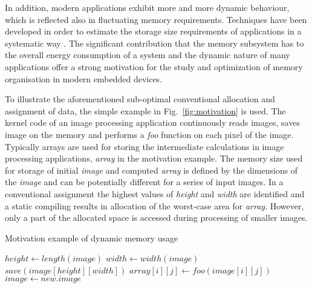 \documentclass{acm_proc_article-sp}
\begin{document}
In addition, modern applications exhibit more and more dynamic behaviour, which is reflected also in fluctuating memory requirements. Techniques have been developed in order to estimate the storage size requirements of applications in a systematic way \cite{Ang13}. The significant contribution that the memory subsystem has to the overall energy consumption of a system and the dynamic nature of many applications offer a strong motivation for the study and optimization of memory organisation in modern embedded devices.

To illustrate the aforementioned sub-optimal conventional allocation and assignment of data, the simple example in Fig.~\ref{fig:motivation} is used. The kernel code of an image processing application continuously reads images, saves image on the memory and performs a \textit{foo} function on each pixel of the image. Typically arrays are used for storing the intermediate calculations in image processing applications, \textit{array} in the motivation example. The memory size used for storage of initial \textit{image} and computed \textit{array} is defined by the dimensions of the \textit{image} and can be potentially different for a series of input images. In a conventional assignment the highest values of \textit{height} and \textit{width} are identified and a static compiling results in allocation of the worst-case area for \textit{array}. However, only a part of the allocated space is accessed during processing of smaller images. 

\begin{algorithm}[H]
\caption{Motivation example of dynamic memory usage}
 \label{fig:motivation}
 \begin{algorithmic}[1]
		\STATE $height \gets length(image)$
		\STATE $width \gets width(image)$
		\STATE $save(image[height][width])$
					\STATE $array[i][j] \gets foo(image[i][j])$
				\ENDFOR
			\ENDFOR
		\STATE $image \gets new.image$	
	\ENDWHILE
 \end{algorithmic}
\end{algorithm}
\end{document}
